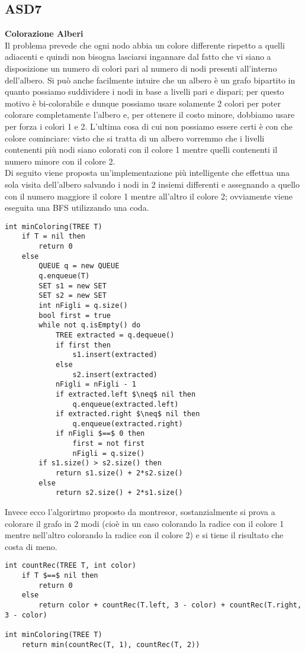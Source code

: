 \documentclass[../cheatSheetAlgoritmi.tex]{subfiles}
\begin{document}
\subsection{ASD7}
\textbf{Colorazione Alberi}\\
Il problema prevede che ogni nodo abbia un colore differente rispetto a quelli adiacenti e quindi non bisogna lasciarsi ingannare dal fatto che vi siano a disposizione un numero di colori pari al numero di nodi presenti all'interno dell'albero. Si può anche facilmente intuire che un albero è un grafo bipartito in quanto possiamo suddividere i nodi in base a livelli pari e dispari; per questo motivo è bi-colorabile e dunque possiamo usare solamente 2 colori per poter colorare completamente l'albero e, per ottenere il costo minore, dobbiamo usare per forza i colori 1 e 2. L'ultima cosa di cui non possiamo essere certi è con che colore cominciare: visto che si tratta di un albero vorremmo che i livelli contenenti più nodi siano colorati con il colore 1 mentre quelli contenenti il numero minore con il colore 2.\\
Di seguito viene proposta un'implementazione più intelligente che effettua una sola visita dell'albero salvando i nodi in 2 insiemi differenti e assegnando a quello con il numero maggiore il colore 1 mentre all'altro il colore 2; ovviamente viene eseguita una BFS utilizzando una coda.
\begin{lstlisting}[caption=Colorazione Alberi]
int minColoring(TREE T)
	if T = nil then
    	return 0
  	else
    	QUEUE q = new QUEUE
    	q.enqueue(T)
    	SET s1 = new SET
    	SET s2 = new SET
    	int nFigli = q.size()
    	bool first = true
    	while not q.isEmpty() do
      		TREE extracted = q.dequeue()
      		if first then
        		s1.insert(extracted)
      		else
        		s2.insert(extracted)
      		nFigli = nFigli - 1
      		if extracted.left $\neq$ nil then
        		q.enqueue(extracted.left)
      		if extracted.right $\neq$ nil then
       			q.enqueue(extracted.right)
      		if nFigli $==$ 0 then
        		first = not first
        		nFigli = q.size()
    	if s1.size() > s2.size() then
      		return s1.size() + 2*s2.size()
    	else
      		return s2.size() + 2*s1.size()
\end{lstlisting}
Invece ecco l'algorirtmo proposto da montresor, sostanzialmente si prova a colorare il grafo in 2 modi (cioè in un caso colorando la radice con il colore 1 mentre nell'altro colorando la radice con il colore 2) e si tiene il risultato che costa di meno.
\begin{lstlisting}[caption=Colorazione Alberi (by Montresor)]
int countRec(TREE T, int color)
	if T $==$ nil then
    	return 0
  	else
    	return color + countRec(T.left, 3 - color) + countRec(T.right, 3 - color)

int minColoring(TREE T)
	return min(countRec(T, 1), countRec(T, 2))
\end{lstlisting}

\newpage
\end{document}

